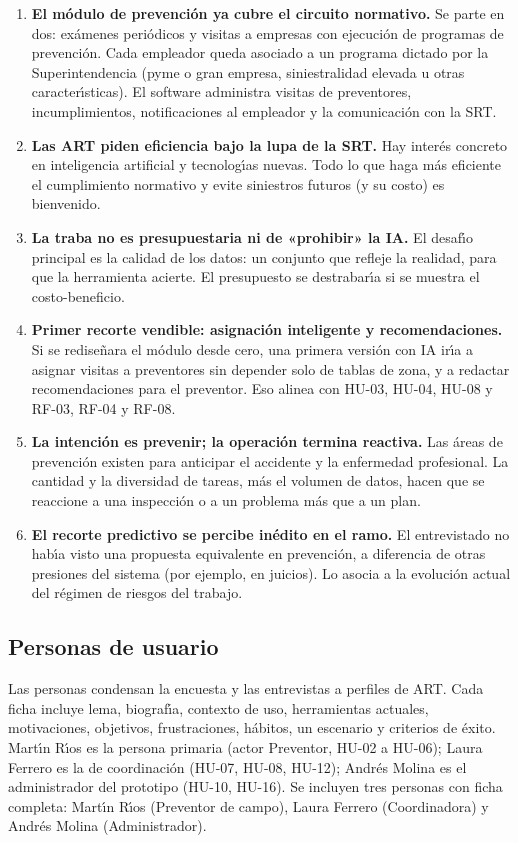 \begin{enumerate}
	\item \textbf{El m\'odulo de prevenci\'on ya cubre el circuito normativo.}
	Se parte en dos: ex\'amenes peri\'odicos y visitas a empresas con ejecuci\'on de programas de prevenci\'on.
	Cada empleador queda asociado a un programa dictado por la Superintendencia (pyme o gran empresa, siniestralidad elevada u otras caracter\'{\i}sticas).
	El software administra visitas de preventores, incumplimientos, notificaciones al empleador y la comunicaci\'on con la SRT.
	\item \textbf{Las ART piden eficiencia bajo la lupa de la SRT.}
	Hay inter\'es concreto en inteligencia artificial y tecnolog\'{\i}as nuevas.
	Todo lo que haga m\'as eficiente el cumplimiento normativo y evite siniestros futuros (y su costo) es bienvenido.
	\item \textbf{La traba no es presupuestaria ni de «prohibir» la IA.}
	El desaf\'{\i}o principal es la calidad de los datos: un conjunto que refleje la realidad, para que la herramienta acierte.
	El presupuesto se destrabar\'{\i}a si se muestra el costo-beneficio.
	\item \textbf{Primer recorte vendible: asignaci\'on inteligente y recomendaciones.}
	Si se redise\~nara el m\'odulo desde cero, una primera versi\'on con IA ir\'{\i}a a asignar visitas a preventores sin depender solo de tablas de zona, y a redactar recomendaciones para el preventor.
	Eso alinea con HU-03, HU-04, HU-08 y RF-03, RF-04 y RF-08.
	\item \textbf{La intenci\'on es prevenir; la operaci\'on termina reactiva.}
	Las \'areas de prevenci\'on existen para anticipar el accidente y la enfermedad profesional.
	La cantidad y la diversidad de tareas, m\'as el volumen de datos, hacen que se reaccione a una inspecci\'on o a un problema m\'as que a un plan.
	\item \textbf{El recorte predictivo se percibe in\'edito en el ramo.}
	El entrevistado no hab\'{\i}a visto una propuesta equivalente en prevenci\'on, a diferencia de otras presiones del sistema (por ejemplo, en juicios).
	Lo asocia a la evoluci\'on actual del r\'egimen de riesgos del trabajo.
\end{enumerate}

\subsection{Personas de usuario}\label{sec:personas}

Las personas condensan la encuesta y las entrevistas a perfiles de ART.
Cada ficha incluye lema, biograf\'{\i}a, contexto de uso, herramientas actuales, motivaciones, objetivos, frustraciones, h\'abitos, un escenario y criterios de \'exito.
Mart\'{\i}n R\'{\i}os es la persona primaria (actor Preventor, HU-02 a HU-06); Laura Ferrero es la de coordinaci\'on (HU-07, HU-08, HU-12); Andr\'es Molina es el administrador del prototipo (HU-10, HU-16).
Se incluyen tres personas con ficha completa: Mart\'{\i}n R\'{\i}os (Preventor de campo), Laura Ferrero (Coordinadora) y Andr\'es Molina (Administrador).

